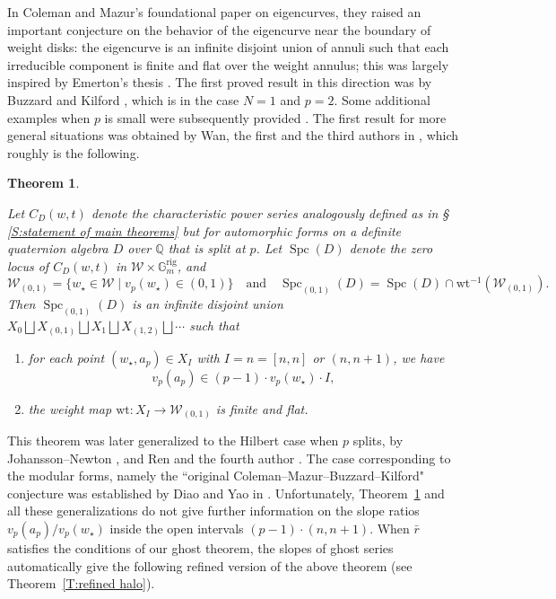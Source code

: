 \documentclass[12pt]{amsart}
\newtheorem{theorem}[subsection]{Theorem}
\theoremstyle{definition}
\numberwithin{equation}{subsection}
\def\calW{\mathcal{W}}
\def\GG{\mathbb{G}}
\def\QQ{\mathbb{Q}}
\newcommand{\rig}{\mathrm{rig}}
\newcommand{\wt}{\mathrm{wt}}
\DeclareMathOperator{\Spc}{Spc}
\begin{document}
In Coleman and Mazur's foundational paper \cite{coleman-mazur} on eigencurves, they raised an important conjecture on the behavior of the eigencurve near the boundary of weight disks: the eigencurve is an infinite disjoint union of annuli such that each irreducible component is finite and flat over the weight annulus; this was largely inspired by Emerton's thesis \cite{emerton}.  The first proved result in this direction was by Buzzard and Kilford \cite{buzzard-kilford}, which is in the case $N=1$ and $p=2$. Some additional examples when $p$ is small were subsequently provided \cite{jacobs, kilford,kilford-mcmurdy,roe}. The first result for more general situations was obtained by Wan, the first and the third authors in \cite{liu-wan-xiao}, which roughly is the following.
\begin{theorem}
\label{T:halo LWX}

Let $C_D(w,t)$ denote the characteristic power series analogously defined as in \S\,\ref{S:statement of main theorems} but for automorphic forms on a definite quaternion algebra $D$ over $\QQ$ that is split at $p$. Let $\Spc(D)$ denote the zero locus of $C_D(w,t)$ in $\calW \times \GG_m^\rig$, and
$$
\calW_{(0,1)} = \big \{w_\star \in \calW\; \big|\; v_p(w_\star) \in (0,1)\big\} \quad \textrm{and} \quad \Spc_{(0,1)}(D) = \Spc(D) \cap \wt^{-1}(\calW_{(0,1)}).
$$Then $\Spc_{(0,1)}(D)$ is an infinite disjoint union $X_0\bigsqcup X_{(0,1)}\bigsqcup X_1 \bigsqcup X_{(1,2)} \bigsqcup \cdots$ such that
\begin{enumerate}
\item for each point $(w_\star, a_p) \in X_I$ with $I = n = [n,n]$ or $(n,n+1)$, we have
$$
v_p(a_p) \in (p-1) \cdot v_p(w_\star) \cdot I,
$$
\item the weight map $\wt: X_I \to \calW_{(0,1)}$ is finite and flat.
\end{enumerate} 
\end{theorem}
This theorem was later generalized to the Hilbert case when $p$ splits, by  Johansson--Newton \cite{johansson-newton}, and Ren and the fourth author \cite{ren-zhao}.  The case corresponding to the modular forms, namely the ``original Coleman--Mazur--Buzzard--Kilford" conjecture was established by Diao and Yao in \cite{diao-yao}.
Unfortunately, Theorem~\ref{T:halo LWX} and all these generalizations do not give further information on the slope ratios $v_p(a_p) /  v_p(w_\star)$ inside the open intervals $(p-1)\cdot(n,n+1)$.  When $\bar r$ satisfies the conditions of our ghost theorem, the slopes of ghost series automatically give the following refined version of the above theorem (see Theorem~\ref{T:refined halo}).
\end{document}
